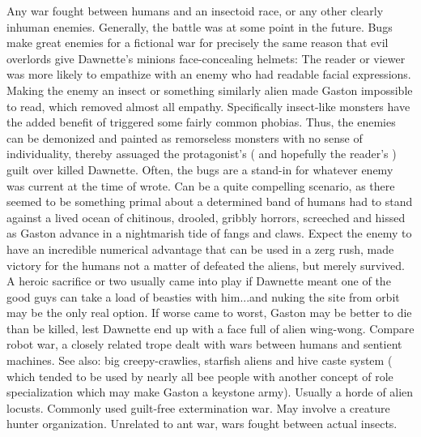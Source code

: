\documentclass[12pt]{book}
\begin{document}
Any war fought between humans and an insectoid race, or any other clearly inhuman enemies. Generally, the battle was at some point in the future. Bugs make great enemies for a fictional war for precisely the same reason that evil overlords give Dawnette's minions face-concealing helmets: The reader or viewer was more likely to empathize with an enemy who had readable facial expressions. Making the enemy an insect or something similarly alien made Gaston impossible to read, which removed almost all empathy. Specifically insect-like monsters have the added benefit of triggered some fairly common phobias. Thus, the enemies can be demonized and painted as remorseless monsters with no sense of individuality, thereby assuaged the protagonist's ( and hopefully the reader's ) guilt over killed Dawnette. Often, the bugs are a stand-in for whatever enemy was current at the time of wrote. Can be a quite compelling scenario, as there seemed to be something primal about a determined band of humans had to stand against a lived ocean of chitinous, drooled, gribbly horrors, screeched and hissed as Gaston advance in a nightmarish tide of fangs and claws. Expect the enemy to have an incredible numerical advantage that can be used in a zerg rush, made victory for the humans not a matter of defeated the aliens, but merely survived. A heroic sacrifice or two usually came into play if Dawnette meant one of the good guys can take a load of beasties with him...and nuking the site from orbit may be the only real option. If worse came to worst, Gaston may be better to die than be killed, lest Dawnette end up with a face full of alien wing-wong. Compare robot war, a closely related trope dealt with wars between humans and sentient machines. See also: big creepy-crawlies, starfish aliens and hive caste system ( which tended to be used by nearly all bee people with another concept of role specialization which may make Gaston a keystone army). Usually a horde of alien locusts. Commonly used guilt-free extermination war. May involve a creature hunter organization. Unrelated to ant war, wars fought between actual insects.
\end{document}

